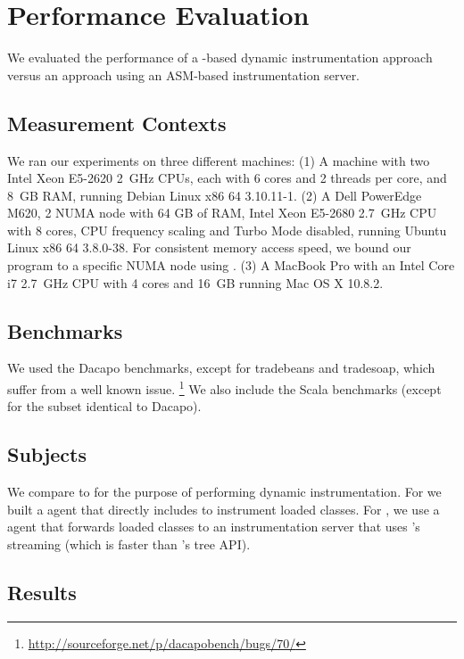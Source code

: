 \section{Performance Evaluation}\label{sec:jnif-evaluation}

We evaluated the performance of a \jnif{}-based dynamic instrumentation approach 
versus an approach using an ASM-based instrumentation server.

\subsection*{Measurement Contexts}

We ran our experiments on three different machines:
(1) A machine with two Intel Xeon E5-2620 2~GHz CPUs, 
each with 6 cores and 2 threads per core, 
and 8~GB RAM,
running Debian Linux x86 64 3.10.11-1.
(2) A Dell PowerEdge M620, 2 NUMA node with 64 GB of RAM, 
Intel Xeon E5-2680 2.7~GHz CPU
with 8 cores, 
CPU frequency scaling and Turbo Mode disabled,
running Ubuntu Linux x86 64 3.8.0-38.
For consistent memory access speed, 
we bound our program to a specific NUMA node using .
(3) A MacBook Pro with an Intel Core i7 2.7~GHz CPU 
with 4 cores and 16~GB
running Mac OS X 10.8.2.

\subsection*{Benchmarks}

We used the Dacapo benchmarks, 
except for tradebeans and tradesoap,
which suffer from a well known issue.%
\footnote{\url{http://sourceforge.net/p/dacapobench/bugs/70/}}
We also include the Scala benchmarks
(except for the subset identical to Dacapo).

\subsection*{Subjects}
We compare \jnif{} to \asm{} for the purpose of performing dynamic instrumentation.
For \jnif{} we built a \jvmti{} agent that directly includes \jnif{} to instrument loaded classes.
For \asm{}, we use a \jvmti{} agent that forwards loaded classes to an instrumentation server
that uses \asm{}'s streaming \api{} (which is faster than \asm{}'s tree API).


\subsection*{Results}

